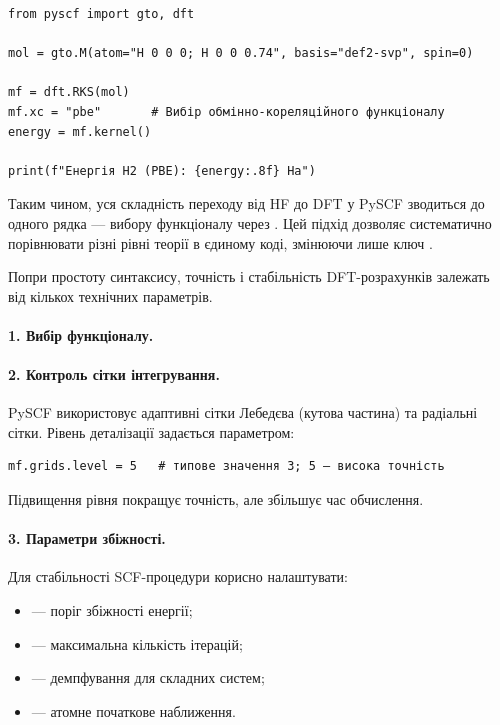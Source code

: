 \begin{verbatim}
from pyscf import gto, dft

mol = gto.M(atom="H 0 0 0; H 0 0 0.74", basis="def2-svp", spin=0)

mf = dft.RKS(mol)
mf.xc = "pbe"       # Вибір обмінно-кореляційного функціоналу
energy = mf.kernel()

print(f"Енергія H2 (PBE): {energy:.8f} Ha")
\end{verbatim}

\noindent
Таким чином, уся складність переходу від HF до DFT у PySCF зводиться до одного рядка ---
вибору функціоналу через .
Цей підхід дозволяє систематично порівнювати різні рівні теорії в єдиному коді,
змінюючи лише ключ .

Попри простоту синтаксису, точність і стабільність DFT-розрахунків залежать від кількох технічних параметрів.

\paragraph{1. Вибір функціоналу.}


\paragraph{2. Контроль сітки інтегрування.}
PySCF використовує адаптивні сітки Лебедєва (кутова частина) та радіальні сітки.
Рівень деталізації задається параметром:
\begin{verbatim}
mf.grids.level = 5   # типове значення 3; 5 — висока точність
\end{verbatim}
Підвищення рівня покращує точність, але збільшує час обчислення.

\paragraph{3. Параметри збіжності.}
Для стабільності SCF-процедури корисно налаштувати:
\begin{itemize}
  \item {} --- поріг збіжності енергії;
  \item {} --- максимальна кількість ітерацій;
  \item {} --- демпфування для складних систем;
  \item {} --- атомне початкове наближення.
\end{itemize}

